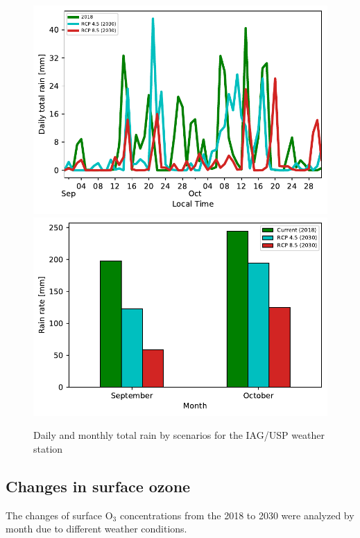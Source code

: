 \begin{figure}[hbt]
  \centering
  \includegraphics{fig/rain_change_iag.pdf}
  \includegraphics{fig/rain_bymonth.pdf}
  \caption{Daily and monthly total rain by scenarios for the IAG/USP weather station}
  \label{fig:rain_change_iag}
\end{figure}

\subsection{Changes in surface ozone}\label{subsec:res_chan_o3}
The changes of surface O$_3$ concentrations from the 2018 to 2030 were analyzed by month due to different weather conditions.


